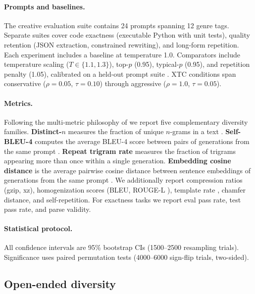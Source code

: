 \documentclass{article}
\newcommand{\xtc}{\textsc{XTC}}
\begin{document}
\paragraph{Prompts and baselines.}
The creative evaluation suite contains 24 prompts spanning 12 genre tags.
Separate suites cover code exactness (executable Python with unit tests), quality retention (JSON extraction, constrained rewriting), and long-form repetition.
Each experiment includes a baseline at temperature 1.0.
Comparators include temperature scaling ($T \in \{1.1, 1.3\}$), top-$p$ (0.95), typical-$p$ (0.95), and repetition penalty (1.05), calibrated on a held-out prompt suite \citep{hewitt2022truncation}.
\xtc{} conditions span conservative ($\rho{=}0.05$, $\tau{=}0.10$) through aggressive ($\rho{=}1.0$, $\tau{=}0.05$).

\paragraph{Metrics.}
Following the multi-metric philosophy of \citet{shaib2024diversity} we report five complementary diversity families.
\textbf{Distinct-$n$} measures the fraction of unique $n$-grams in a text \citep{li2016diversity}.
\textbf{Self-BLEU-4} computes the average BLEU-4 score \citep{papineni2002bleu} between pairs of generations from the same prompt \citep{zhu2018texygen}.
\textbf{Repeat trigram rate} measures the fraction of trigrams appearing more than once within a single generation.
\textbf{Embedding cosine distance} is the average pairwise cosine distance between sentence embeddings of generations from the same prompt \citep{zhang2020bertscore}.
We additionally report compression ratios (gzip, xz), homogenization scores (BLEU, ROUGE-L \citep{lin2004rouge}), template rate \citep{shaib2024templates}, chamfer distance, and self-repetition.
For exactness tasks we report eval pass rate, test pass rate, and parse validity.

\paragraph{Statistical protocol.}
All confidence intervals are 95\% bootstrap CIs (1500--2500 resampling trials).
Significance uses paired permutation tests (4000--6000 sign-flip trials, two-sided).

\subsection{Open-ended diversity}
\label{sec:exp_creative}
\end{document}
